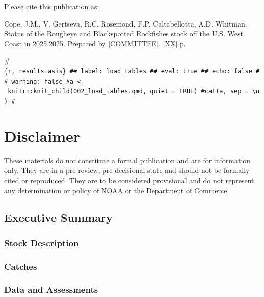 \documentclass[
]{scrartcl}
\renewcommand*\contentsname{Table of contents}
\newcommand\contentsname{Table of contents}
\begin{document}
\renewcommand*\contentsname{Table of contents}
{
\hypersetup{linkcolor=}
\setcounter{tocdepth}{3}
\tableofcontents
}
\listoffigures
\listoftables

\newpage{}

Please cite this publication as:

Cope, J.M., V. Gertseva, R.C. Rosemond, F.P. Caltabellotta, A.D.
Whitman. Status of the Rougheye and Blackspotted Rockfishes stock off
the U.S. West Coast in 2025.2025. Prepared by {[}COMMITTEE{]}. {[}XX{]}
p.

\newpage{}

\#\texttt{\{r,\ results=\textquotesingle{}asis\textquotesingle{}\}\ \#\#\textbar{}\ label:\ \textquotesingle{}load\_tables\textquotesingle{}\ \#\#\textbar{}\ eval:\ true\ \#\#\textbar{}\ echo:\ false\ \#\#\textbar{}\ warning:\ false\ \#a\ \textless{}-\ knitr::knit\_child(\textquotesingle{}002\_load\_tables.qmd\textquotesingle{},\ quiet\ =\ TRUE)\ \#cat(a,\ sep\ =\ \textquotesingle{}\textbackslash{}n\textquotesingle{})\ \#}

\section*{Disclaimer}\label{disclaimer}

These materials do not constitute a formal publication and are for
information only. They are in a pre-review, pre-decisional state and
should not be formally cited or reproduced. They are to be considered
provisional and do not represent any determination or policy of NOAA or
the Department of Commerce.

\newpage{}

\subsection{Executive Summary}\label{executive-summary}

\subsubsection{Stock Description}\label{stock-description}

\subsubsection{Catches}\label{catches}

\subsubsection{Data and Assessments}\label{data-and-assessments}
\end{document}
